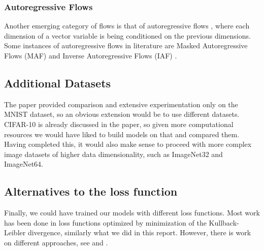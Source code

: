 \subsubsection{Autoregressive Flows}
Another emerging category of flows is that of autoregressive flows \cite{autoregressive}, where each dimension of a vector variable is being conditioned on the previous dimensions.  Some instances of autoregressive flows in literature are Masked Autoregressive Flows (MAF)\cite{maf} and Inverse Autoregressive Flows (IAF) \cite{autoregressive}.


\subsection{Additional Datasets}
The paper provided comparison and extensive experimentation only on the MNIST dataset, so an obvious extension would be to use different datasets. CIFAR-10 is already discussed in the paper, so given more computational resources we would have liked to build models on that and compared them. Having completed this, it would also make sense to proceed with more complex image datasets of higher data dimensionality,  such as ImageNet32 and ImageNet64.


\subsection{Alternatives to the loss function}
Finally, we could have trained our models with different loss functions. Most work has been done in loss functions optimized by minimization of the Kullback-Leibler divergence, similarly what we did in this report. However, there is work on different approaches, see \cite{flow_gan} and \cite{wass}.